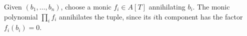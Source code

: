 Given $(b_1,\ldots,b_n)$, choose a monic $f_i\in A[T]$ annihilating $b_i$. The monic polynomial $\prod_i f_i$ annihilates the tuple, since its $i$th component has the factor $f_i(b_i)=0$.
